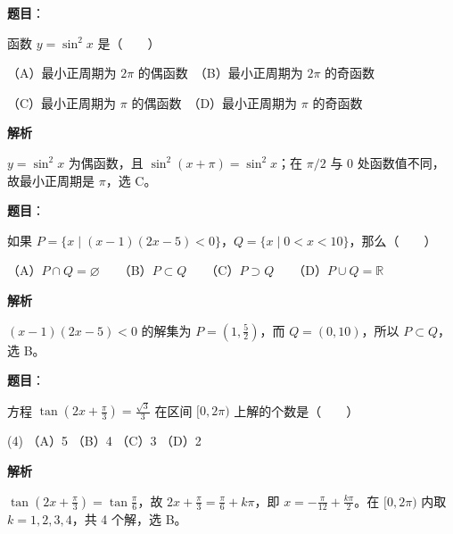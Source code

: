 

\begin{answer}

\textbf{题目}：

函数 $y=\sin^2 x$ 是\mbox{（　　）}

（A）最小正周期为 $2\pi$ 的偶函数　（B）最小正周期为 $2\pi$ 的奇函数

（C）最小正周期为 $\pi$ 的偶函数　（D）最小正周期为 $\pi$ 的奇函数

\textbf{解析}

$y=\sin^2x$ 为偶函数，且 $\sin^2(x+\pi)=\sin^2x$；在 $\pi/2$ 与 $0$ 处函数值不同，故最小正周期是 $\pi$，选 C。


\end{answer}
\begin{answer}

\textbf{题目}：

如果 $P=\{x\mid(x-1)(2x-5)<0\}$，$Q=\{x\mid0<x<10\}$，那么\mbox{（　　）}

（A）$P\cap Q=\varnothing$　　（B）$P\subset Q$　　（C）$P\supset Q$　　（D）$P\cup Q=\mathbb R$

\textbf{解析}

$(x-1)(2x-5)<0$ 的解集为 $P=(1,\frac52)$，而 $Q=(0,10)$，所以 $P\subset Q$，选 B。


\end{answer}
\begin{answer}

\textbf{题目}：

方程 $\tan\left(2x+\frac\pi3\right)=\frac{\sqrt3}{3}$ 在区间 $[0,2\pi)$ 上解的个数是\mbox{（　　）}

\begin{gkopts}(4)
\task （A）5
\task （B）4
\task （C）3
\task （D）2
\end{gkopts}

\textbf{解析}

$\tan(2x+\frac\pi3)=\tan\frac\pi6$，故 $2x+\frac\pi3=\frac\pi6+k\pi$，即 $x=-\frac\pi{12}+\frac{k\pi}{2}$。在 $[0,2\pi)$ 内取 $k=1,2,3,4$，共 4 个解，选 B。


\end{answer}
